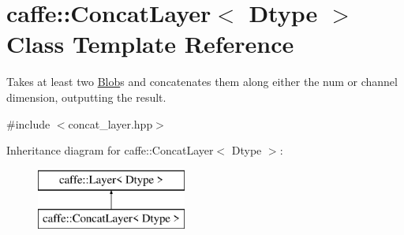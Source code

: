 \hypertarget{classcaffe_1_1ConcatLayer}{}\section{caffe\+:\+:Concat\+Layer$<$ Dtype $>$ Class Template Reference}
\label{classcaffe_1_1ConcatLayer}


Takes at least two \hyperlink{classcaffe_1_1Blob}{Blob}s and concatenates them along either the num or channel dimension, outputting the result.  




{\ttfamily \#include $<$concat\+\_\+layer.\+hpp$>$}

Inheritance diagram for caffe\+:\+:Concat\+Layer$<$ Dtype $>$\+:\begin{figure}[H]
\begin{center}
\leavevmode
\includegraphics[height=2.000000cm]{classcaffe_1_1ConcatLayer}
\end{center}
\end{figure}
